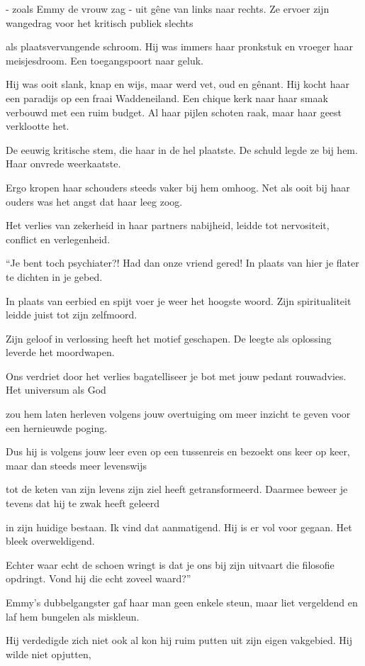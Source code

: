 - zoals Emmy de vrouw zag -
uit gêne van links naar rechts.
Ze ervoer zijn wangedrag
voor het kritisch publiek slechts

als plaatsvervangende schroom.
Hij was immers haar pronkstuk
en vroeger haar meisjesdroom.
Een toegangspoort naar geluk.

Hij was ooit slank, knap en wijs,
maar werd vet, oud en gênant.
Hij kocht haar een paradijs
op een fraai Waddeneiland.
Een chique kerk naar haar smaak
verbouwd met een ruim budget.
Al haar pijlen schoten raak,
maar haar geest verklootte het.

De eeuwig kritische stem,
die haar in de hel plaatste.
De schuld legde ze bij hem.
Haar onvrede weerkaatste.

Ergo kropen haar schouders
steeds vaker bij hem omhoog.
Net als ooit bij haar ouders
was het angst dat haar leeg zoog.

Het verlies van zekerheid
in haar partners nabijheid,
leidde tot nervositeit,
conflict en verlegenheid.

“Je bent toch psychiater?!
Had dan onze vriend gered!
In plaats van hier je flater
te dichten in je gebed.

In plaats van eerbied en spijt
voer je weer het hoogste woord.
Zijn spiritualiteit
leidde juist tot zijn zelfmoord.

Zijn geloof in verlossing
heeft het motief geschapen.
De leegte als oplossing
leverde het moordwapen.

Ons verdriet door het verlies
bagatelliseer je bot
met jouw pedant rouwadvies.
Het universum als God

zou hem laten herleven
volgens jouw overtuiging
om meer inzicht te geven
voor een hernieuwde poging.

Dus hij is volgens jouw leer
even op een tussenreis
en bezoekt ons keer op keer,
maar dan steeds meer levenswijs

tot de keten van zijn levens
zijn ziel heeft getransformeerd.
Daarmee beweer je tevens
dat hij te zwak heeft geleerd

in zijn huidige bestaan.
Ik vind dat aanmatigend.
Hij is er vol voor gegaan.
Het bleek overweldigend.

Echter waar echt de schoen wringt
is dat je ons bij zijn uitvaart
die filosofie opdringt.
Vond hij die echt zoveel waard?”

Emmy’s dubbelgangster gaf
haar man geen enkele steun,
maar liet vergeldend en laf
hem bungelen als miskleun.

Hij verdedigde zich niet
ook al kon hij ruim putten
uit zijn eigen vakgebied.
Hij wilde niet opjutten,

